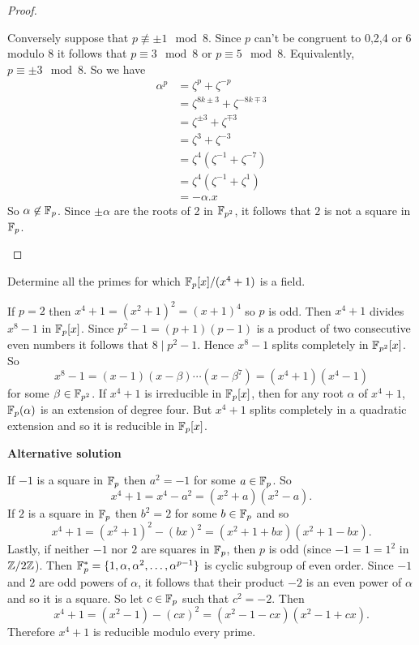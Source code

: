 \begin{proof}
\begin{enumerate}
            Conversely suppose that $p\not\equiv\pm 1\mod 8$. 
            Since $p$ can't be congruent to 0,2,4 or 6 modulo 8 it follows that $p\equiv 3\mod 8$ or $p\equiv 5\mod 8$.
            Equivalently, $p\equiv\pm 3\mod 8$. So we have
            \begin{align*}
                \alpha^p&=\zeta^p+\zeta^{-p}\\
                &=\zeta^{8k\pm 3}+\zeta^{-8k\mp 3}\\
                &=\zeta^{\pm 3}+\zeta^{\mp 3}\\
                &=\zeta^3+\zeta^{-3}\\
                &=\zeta^4\left(\zeta^{-1}+\zeta^{-7}\right)\\
                &=\zeta^4\left(\zeta^{-1}+\zeta^1\right)\\
                &=-\alpha.x
            \end{align*}
            So $\alpha\not\in\mathbb{F}_p$. 
            Since $\pm\alpha$ are the roots of 2 in $\mathbb{F}_{p^2}$, it follows that $2$ is not a square in $\mathbb{F}_p$.
    \end{enumerate}
\end{proof}

\begin{ex}{22.15}
    Determine all the primes for which $\mathbb{F}_p[x]/(x^4+1)$ is a field. 
\end{ex}
\begin{sol}
    If $p=2$ then $x^4+1=(x^2+1)^2=(x+1)^4$ so $p$ is odd. 
    Then $x^4+1$ divides $x^8-1$ in $\mathbb{F}_p[x]$. 
    Since $p^2-1=(p+1)(p-1)$ is a product of two consecutive even numbers it follows that $8\mid p^2-1$.
    Hence $x^8-1$ splits completely in $\mathbb{F}_{p^2}[x]$. So
    $$x^8-1=(x-1)(x-\beta)\cdots(x-\beta^7)=(x^4+1)(x^4-1)$$
    for some $\beta\in\mathbb{F}_{p^2}$. 
    If $x^4+1$ is irreducible in $\mathbb{F}_p[x]$, then for any root $\alpha$ of $x^4+1$, $\mathbb{F}_p(\alpha)$ is an extension of degree four.
    But $x^4+1$ splits completely in a quadratic extension and so it is reducible in $\mathbb{F}_p[x]$.

    \noindent\textbf{Alternative solution}
    
    If $-1$ is a square in $\mathbb{F}_p$ then $a^2=-1$ for some $a\in\mathbb{F}_p$. So
    $$x^4+1=x^4-a^2=(x^2+a)(x^2-a).$$
    If $2$ is a square in $\mathbb{F}_p$ then $b^2=2$ for some $b\in\mathbb{F}_p$ and so
    $$x^4+1=(x^2+1)^2-(bx)^2=(x^2+1+bx)(x^2+1-bx).$$
    Lastly, if neither $-1$ nor $2$ are squares in $\mathbb{F}_p$, then $p$ is odd (since $-1=1=1^2$ in $\mathbb{Z}/2\mathbb{Z}$).
    Then $\mathbb{F}_p^*=\{1,\alpha, \alpha^2,\dots,\alpha^{p-1}\}$ is cyclic subgroup of even order. 
    Since $-1$ and $2$ are odd powers of $\alpha$, it follows that their product $-2$ is an even power of $\alpha$ and so it is a square.
    So let $c\in\mathbb{F}_p$ such that $c^2=-2$. Then
    $$x^4+1=(x^2-1)-(cx)^2=(x^2-1-cx)(x^2-1+cx).$$
    Therefore $x^4+1$ is reducible modulo every prime.
\end{sol}